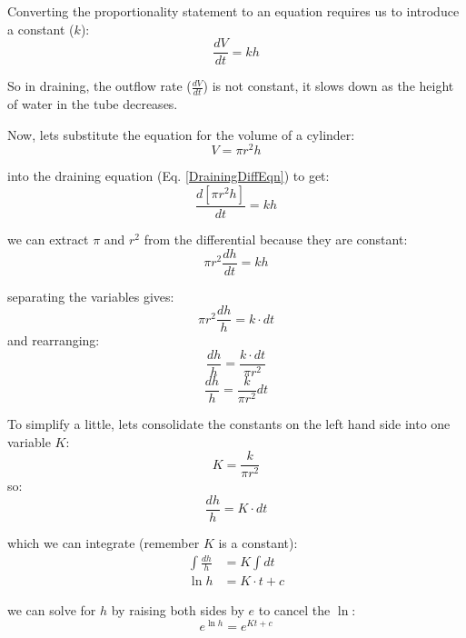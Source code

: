 \documentclass[11pt,fleqn]{book}
\begin{document}
	Converting the proportionality statement to an equation requires us to introduce a constant ($k$):
	\begin{equation}
		\label{DrainingDiffEqn}
		\frac{dV}{dt} = k h
	\end{equation}
	
	So in draining, the outflow rate ($\frac{dV}{dt}$) is not constant, it slows down as the height of water in the tube decreases. 
	
	Now, lets substitute the equation for the volume of a cylinder:
	\begin{equation}
		V = \pi r^2 h
	\end{equation}
	
	into the draining equation (Eq. \ref{DrainingDiffEqn}) to get:
	\begin{equation}
		\frac{d[\pi r^2 h]}{dt} = k h
	\end{equation}
	
	we can extract $\pi$ and $r^2$ from the differential because they are constant:
	\begin{equation}
		\pi r^2 \frac{dh}{dt} = k h
	\end{equation}
	
	separating the variables gives:
	\begin{equation}
		\pi r^2 \frac{dh}{h} = k \cdot dt
	\end{equation}
	and rearranging:
	\begin{equation}
		\frac{dh}{h} = \frac{k \cdot dt}{\pi r^2 }
	\end{equation}
	\begin{equation}
		\frac{dh}{h} = \frac{k}{\pi r^2 } dt
	\end{equation}
	
	To simplify a little, lets consolidate the constants on the left hand side into one variable $K$:
	\begin{equation}
		K = \frac{k}{\pi r^2 }
	\end{equation}
	so:
	\begin{equation}
		\frac{dh}{h} = K \cdot dt 
	\end{equation}
	
	which we can integrate (remember $K$ is a constant):
	\begin{align}
		\int \frac{dh}{h} &= K \int dt \\
		\ln{h} &= K \cdot t + c
	\end{align}
	
	we can solve for $h$ by raising both sides by $e$ to cancel the $\ln$:
	\begin{equation}
		e^{\ln{h}} = e^{K t + c}
	\end{equation}
	
\end{document}
